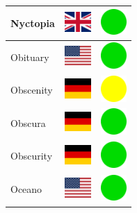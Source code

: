 \documentclass[12pt, a4paper, twoside]{report}
\begin{document}
\begin{center}
\begin{longtable}{|p{5cm}|p{2cm}|p{2cm}|}
 Nyctopia                                                   & \includegraphics[width=1cm]{../4x3/gb} &   \includegraphics[width=1cm]{../likes/y} \\ \hline
 Obituary                                                   & \includegraphics[width=1cm]{../4x3/us} &   \includegraphics[width=1cm]{../likes/y} \\ \hline
 Obscenity                                                  & \includegraphics[width=1cm]{../4x3/de} &   \includegraphics[width=1cm]{../likes/m} \\ \hline
 Obscura                                                    & \includegraphics[width=1cm]{../4x3/de} &   \includegraphics[width=1cm]{../likes/y} \\ \hline
 Obscurity                                                  & \includegraphics[width=1cm]{../4x3/de} &   \includegraphics[width=1cm]{../likes/y} \\ \hline
 Oceano                                                     & \includegraphics[width=1cm]{../4x3/us} &   \includegraphics[width=1cm]{../likes/y} \\ \hline

\end{longtable}
\end{center}
\end{document}
